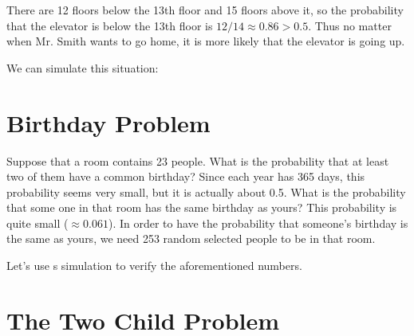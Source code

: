 There are 12 floors below the 13th floor and 15 floors above it, so the probability that the elevator is below the 13th floor is $12/14\approx0.86>0.5$. Thus no matter when Mr. Smith wants to go home, it is more likely that the elevator is going up.

We can simulate this situation:




\hypertarget{birthday-problem}{%
  \section{Birthday Problem}\label{birthday-problem}}

Suppose that a room contains 23 people. What is the probability that
at least two of them have a common birthday? Since each year has 365
days, this probability seems very small, but it is actually about
0.5. What is the probability that some one in that room has the same
birthday as yours? This probability is quite small
($\approx0.061$). In order to have the probability that someone's
birthday is the same as yours, we need 253 random selected people to
be in that room.

Let's use s simulation to verify the aforementioned numbers.





\hypertarget{the-two-child-problem}{%
\section{The Two Child Problem}\label{the-two-child-problem}}


